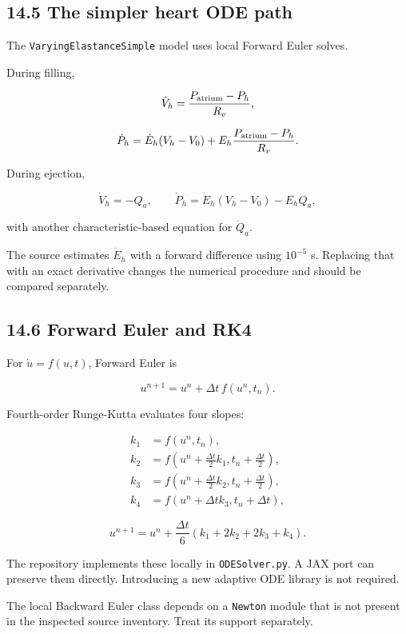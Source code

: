 \documentclass[11pt,a4paper]{article}
\begin{document}
\subsection{14.5 The simpler heart ODE path}
The \texttt{VaryingElastanceSimple} model uses local Forward Euler solves.

During filling,


\begingroup\small
\[
\dot V_h=\frac{P_{\rm atrium}-P_h}{R_v},
\]
\endgroup



\begingroup\small
\[
\dot P_h=\dot E_h(V_h-V_0)
+E_h\frac{P_{\rm atrium}-P_h}{R_v}.
\]
\endgroup


During ejection,


\begingroup\small
\[
\dot V_h=-Q_a,
\qquad
\dot P_h=\dot E_h(V_h-V_0)-E_hQ_a,
\]
\endgroup


with another characteristic-based equation for \(\dot Q_a\).

The source estimates \(\dot E_h\) with a forward difference using \(10^{-5}\) s. Replacing that with an exact derivative changes the numerical procedure and should be compared separately.

\subsection{14.6 Forward Euler and RK4}
For \(\dot u=f(u,t)\), Forward Euler is


\begingroup\small
\[
u^{n+1}=u^n+\Delta t\,f(u^n,t_n).
\]
\endgroup


Fourth-order Runge-Kutta evaluates four slopes:


\begingroup\small
\[
\begin{aligned}
k_1&=f(u^n,t_n),\\
k_2&=f(u^n+\tfrac{\Delta t}{2}k_1,t_n+\tfrac{\Delta t}{2}),\\
k_3&=f(u^n+\tfrac{\Delta t}{2}k_2,t_n+\tfrac{\Delta t}{2}),\\
k_4&=f(u^n+\Delta t k_3,t_n+\Delta t),
\end{aligned}
\]
\endgroup



\begingroup\small
\[
u^{n+1}
=u^n+\frac{\Delta t}{6}(k_1+2k_2+2k_3+k_4).
\]
\endgroup


The repository implements these locally in \texttt{ODESolver.\allowbreak{}py}. A JAX port can preserve them directly. Introducing a new adaptive ODE library is not required.

The local Backward Euler class depends on a \texttt{Newton} module that is not present in the inspected source inventory. Treat its support separately.
\end{document}
